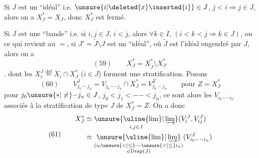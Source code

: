 
Si $J$ est un ``idéal'' i.e. $\unsure{i|\deleted{x}\inserted{i}}\in J$, $j<i\Longrightarrow j\in J$,
alors on a $X_J^*=X_J$, donc $X_J^*$ est fermé.

Si $J$ est une ``bande'' i.e. si $i,j\in J$, $i<j$,
alors $\forall k\in I$, $(i<k<j\Longrightarrow k\in J)$,
ou ce qui revient au $=$, si $J'=\widetilde J\setminus J$ est
un ``idéal'', où $\widetilde J$ est l'idéal engendré par $J$,
alors on a
\[
(59)\qquad X_J^*=X_{\widetilde J}^*\setminus X_{J'}^*
\]
.
dont les $X_i^J\overset{\mathrm{déf}}{=}X_i\cap X_J^*$ ($i\in J$)
forment une stratification. Posons
\[
(60)\qquad V_{j_0-j_n}^J
=V_{j_0\mathord{-}\mathord{-}j_n}\cap X_J^*=V_{j_0-j_n}^Z
\qquad\text{pour }Z=X_J^*
\]
pour $j_0\unsure{\ast|\ne}\mathord{-}j_n\in J$, $j_0<j_1<\mathord{-}\mathord{-}<j_n$,
ce sont alors les $V_{i_0\mathord{-}\mathord{-}i_n}$ associés à la stratification
de type $J$ de $X_J^*=Z$. On a donc
\[
(61)\qquad\begin{aligned}
X_J^*&\simeq\underset{i,j\in J}{\unsure{\uline{\lim}|\varinjlim}}
(V_i^J,V_{ij}^J)\\
&\simeq\underset{\substack{(i_0\unsure{<|\leq}\mathord{\cdot}\mathord{-}\unsure{<|\leq}i_n)\\\in\operatorname{Drap}(J)}}{\unsure{\uline{\lim}|\varinjlim}}
(V_{i_0\mathord{-}\mathord{-}i_n}^J)
\end{aligned}
\]



